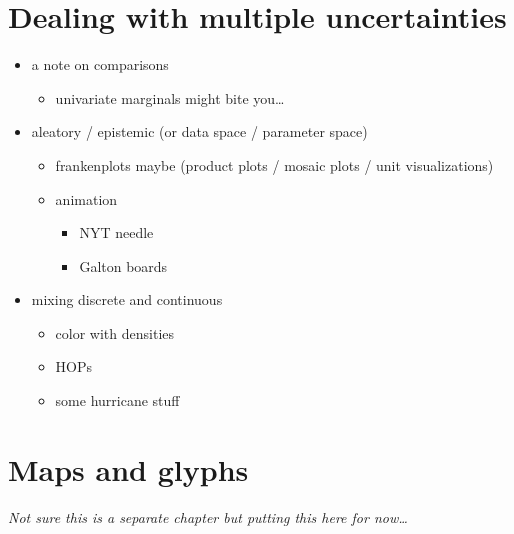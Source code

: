 \documentclass[]{book}
\providecommand{\tightlist}{%
  \setlength{\itemsep}{0pt}\setlength{\parskip}{0pt}}
\theoremstyle{definition}
\theoremstyle{definition}
\theoremstyle{definition}
\theoremstyle{remark}
\begin{document}
\hypertarget{ch-multiple}{%
\chapter{Dealing with multiple uncertainties}\label{ch-multiple}}

\begin{itemize}
\tightlist
\item
  a note on comparisons

  \begin{itemize}
  \tightlist
  \item
    univariate marginals might bite you\ldots{}
  \end{itemize}
\item
  aleatory / epistemic (or data space / parameter space)

  \begin{itemize}
  \tightlist
  \item
    frankenplots maybe (product plots / mosaic plots / unit
    visualizations)
  \item
    animation

    \begin{itemize}
    \tightlist
    \item
      NYT needle
    \item
      Galton boards
    \end{itemize}
  \end{itemize}
\item
  mixing discrete and continuous

  \begin{itemize}
  \tightlist
  \item
    color with densities
  \item
    HOPs
  \item
    some hurricane stuff
  \end{itemize}
\end{itemize}

\hypertarget{ch-maps-glyphs}{%
\chapter{Maps and glyphs}\label{ch-maps-glyphs}}

\emph{Not sure this is a separate chapter but putting this here for
now\ldots{}}
\end{document}
